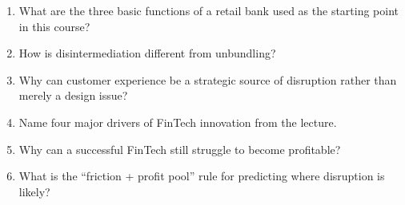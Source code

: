 \begin{quickcheck}
\begin{enumerate}
  \item What are the three basic functions of a retail bank used as the starting point in this course?
  \item How is disintermediation different from unbundling?
  \item Why can customer experience be a strategic source of disruption rather than merely a design issue?
  \item Name four major drivers of FinTech innovation from the lecture.
  \item Why can a successful FinTech still struggle to become profitable?
  \item What is the ``friction + profit pool'' rule for predicting where disruption is likely?
\end{enumerate}
\end{quickcheck}
